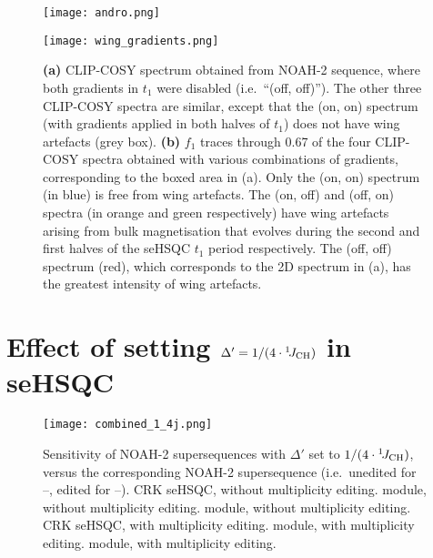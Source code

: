 \begin{figure}
    \centering
    \texttt{[image: andro.png]}

    \texttt{[image: wing\_gradients.png]}
    \caption{
        \textbf{(a)} CLIP-COSY spectrum obtained from NOAH-2  sequence, where both gradients in $t_1$ were disabled (i.e.\ ``(off, off)'').
        The other three CLIP-COSY spectra are similar, except that the (on, on) spectrum (with gradients applied in both halves of $t_1$) does not have wing artefacts (grey box).
        \textbf{(b)} $f_1$ traces through \SI{0.67}{\ppm} of the four CLIP-COSY spectra obtained with various combinations of gradients, corresponding to the boxed area in (a).
        Only the (on, on) spectrum (in blue) is free from wing artefacts.
        The (on, off) and (off, on) spectra (in orange and green respectively) have wing artefacts arising from bulk magnetisation that evolves during the second and first halves of the seHSQC $t_1$ period respectively.
        The (off, off) spectrum (red), which corresponds to the 2D spectrum in (a), has the greatest intensity of wing artefacts.
        \andro{}
    }
    \label{fig:wing_gradients}
\end{figure}


\section{Effect of setting \texorpdfstring{$\Delta' = 1/(4\cdot\onejch)$}{Delta' = 1/(4*1JCH)} in seHSQC}

\begin{figure}
    \centering
    \texttt{[image: combined\_1\_4j.png]}
    {\label{fig:combined_1_4j_crk}}
    {\label{fig:combined_1_4j_spv1}}
    {\label{fig:combined_1_4j_spv2}}
    {\label{fig:combined_1_4j_ed_crk}}
    {\label{fig:combined_1_4j_ed_spv1}}
    {\label{fig:combined_1_4j_ed_spv2}}
    \caption{
        Sensitivity of NOAH-2  supersequences with $\Delta'$ set to $1/(4\cdot\onejch)$, versus the corresponding NOAH-2  supersequence (i.e.\ unedited for --, edited for --).
        \textbf{} CRK seHSQC, without multiplicity editing.
        \textbf{} \noahSpa{} module, without multiplicity editing.
        \textbf{} \noahSpb{} module, without multiplicity editing.
        \textbf{} CRK seHSQC, with multiplicity editing.
        \textbf{} \noahSpa{} module, with multiplicity editing.
        \textbf{} \noahSpb{} module, with multiplicity editing.
        \andro{}
    }
    \label{fig:combined_1_4j}
\end{figure}

